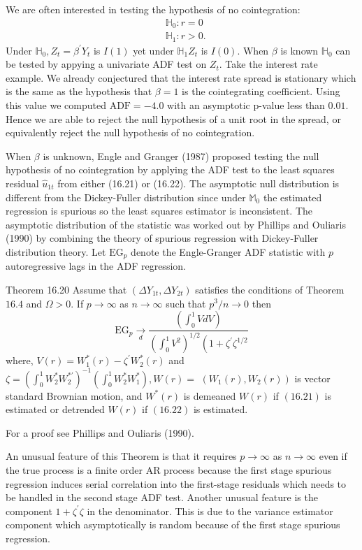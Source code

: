 \documentclass[10pt]{article}
\begin{document}
We are often interested in testing the hypothesis of no cointegration:
$$
\begin{aligned}
&\mathbb{H}_{0}: r=0 \\
&\mathbb{H}_{1}: r>0 .
\end{aligned}
$$
Under $\mathbb{H}_{0}, Z_{t}=\beta^{\prime} Y_{t}$ is $I(1)$ yet under $\mathbb{H}_{1} Z_{t}$ is $I(0)$. When $\beta$ is known $\mathbb{H}_{0}$ can be tested by appying a univariate ADF test on $Z_{t}$. Take the interest rate example. We already conjectured that the interest rate spread is stationary which is the same as the hypothesis that $\beta=1$ is the cointegrating coefficient. Using this value we computed $\mathrm{ADF}=-4.0$ with an asymptotic $\mathrm{p}$-value less than $0.01$. Hence we are able to reject the null hypothesis of a unit root in the spread, or equivalently reject the null hypothesis of no cointegration.

When $\beta$ is unknown, Engle and Granger (1987) proposed testing the null hypothesis of no cointegration by applying the ADF test to the least squares residual $\widehat{u}_{1 t}$ from either (16.21) or (16.22). The asymptotic null distribution is different from the Dickey-Fuller distribution since under $\mathbb{M}_{0}$ the estimated regression is spurious so the least squares estimator is inconsistent. The asymptotic distribution of the statistic was worked out by Phillips and Ouliaris (1990) by combining the theory of spurious regression with Dickey-Fuller distribution theory. Let $\mathrm{EG}_{p}$ denote the Engle-Granger ADF statistic with $p$ autoregressive lags in the ADF regression.

Theorem 16.20 Assume that $\left(\Delta Y_{1 t}, \Delta Y_{2 t}\right)$ satisfies the conditions of Theorem $16.4$ and $\Omega>0$. If $p \rightarrow \infty$ as $n \rightarrow \infty$ such that $p^{3} / n \rightarrow 0$ then
$$
\mathrm{EG}_{p} \underset{d}{\rightarrow} \frac{\left(\int_{0}^{1} V d V\right)}{\left(\int_{0}^{1} V^{2}\right)^{1 / 2}\left(1+\zeta^{\prime} \zeta^{1 / 2}\right.}
$$
where, $V(r)=W_{1}^{*}(r)-\zeta^{\prime} W_{2}^{*}(r)$ and $\zeta=\left(\int_{0}^{1} W_{2}^{*} W_{2}^{* \prime}\right)^{-1}\left(\int_{0}^{1} W_{2}^{*} W_{1}^{*}\right), W(r)=$ $\left(W_{1}(r), W_{2}(r)\right)$ is vector standard Brownian motion, and $W^{*}(r)$ is demeaned $W(r)$ if $(16.21)$ is estimated or detrended $W(r)$ if $(16.22)$ is estimated.

For a proof see Phillips and Ouliaris (1990).

An unusual feature of this Theorem is that it requires $p \rightarrow \infty$ as $n \rightarrow \infty$ even if the true process is a finite order AR process because the first stage spurious regression induces serial correlation into the first-stage residuals which needs to be handled in the second stage ADF test. Another unusual feature is the component $1+\zeta^{\prime} \zeta$ in the denominator. This is due to the variance estimator component which asymptotically is random because of the first stage spurious regression.
\end{document}
